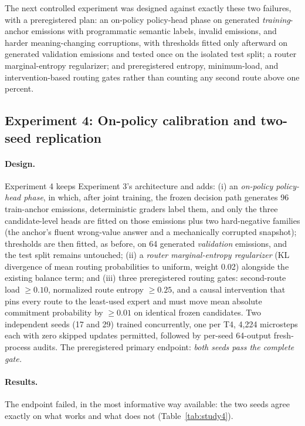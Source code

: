 \documentclass[10pt,a4paper]{article}
\begin{document}
The next controlled experiment was designed against exactly these two
failures, with a preregistered plan: an on-policy policy-head phase on
generated \emph{training}-anchor emissions with programmatic semantic labels,
invalid emissions, and harder meaning-changing corruptions, with thresholds
fitted only afterward on generated validation emissions and tested once on
the isolated test split; a router marginal-entropy regularizer; and
preregistered entropy, minimum-load, and intervention-based routing gates
rather than counting any second route above one percent.

\subsection{Experiment 4: On-policy calibration and two-seed replication}
\label{sec:study4}

\paragraph{Design.}
Experiment 4 keeps Experiment 3's architecture and adds: (i) an \emph{on-policy
policy-head phase}, in which, after joint training, the frozen decision path
generates 96 train-anchor emissions, deterministic graders label them, and
only the three candidate-level heads are fitted on those emissions plus two
hard-negative families (the anchor's fluent wrong-value answer and a
mechanically corrupted snapshot); thresholds are then fitted, as before, on 64
generated \emph{validation} emissions, and the test split remains untouched;
(ii) a \emph{router marginal-entropy regularizer} (KL divergence of mean
routing probabilities to uniform, weight 0.02) alongside the existing balance
term; and (iii) three preregistered routing gates: second-route load
$\ge 0.10$, normalized route entropy $\ge 0.25$, and a causal intervention
that pins every route to the least-used expert and must move mean absolute
commitment probability by $\ge 0.01$ on identical frozen candidates. Two
independent seeds (17 and 29) trained concurrently, one per T4, 4,224
microsteps each with zero skipped updates permitted, followed by per-seed
64-output fresh-process audits. The preregistered primary endpoint:
\emph{both seeds pass the complete gate.}

\paragraph{Results.}
The endpoint failed, in the most informative way available: the two seeds
agree exactly on what works and what does not
(Table~\ref{tab:study4}).
\end{document}

